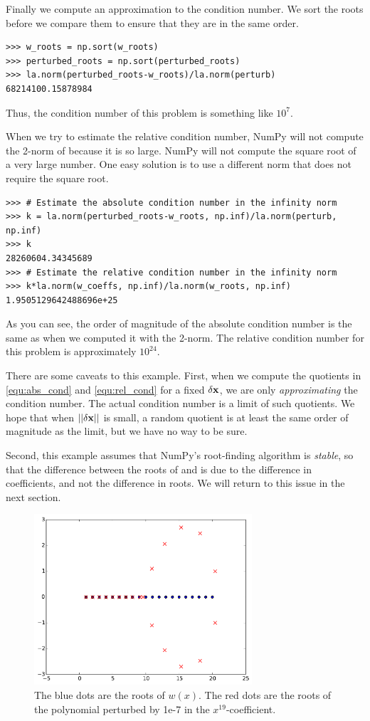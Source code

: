 Finally we compute an approximation to the condition number.
We sort the roots before we compare them to ensure that they are in the same order.
\begin{lstlisting}
>>> w_roots = np.sort(w_roots)
>>> perturbed_roots = np.sort(perturbed_roots)
>>> la.norm(perturbed_roots-w_roots)/la.norm(perturb)
68214100.15878984
\end{lstlisting}
Thus, the condition number of this problem is something like $10^7$. 

When we try to estimate the relative condition number, NumPy will not compute the 2-norm of  because it is so large.
NumPy will not compute the square root of a very large number.
One easy solution is to use a different norm that does not require the square root. 
\begin{lstlisting}
>>> # Estimate the absolute condition number in the infinity norm
>>> k = la.norm(perturbed_roots-w_roots, np.inf)/la.norm(perturb, np.inf)
>>> k
28260604.34345689
>>> # Estimate the relative condition number in the infinity norm
>>> k*la.norm(w_coeffs, np.inf)/la.norm(w_roots, np.inf)
1.9505129642488696e+25
\end{lstlisting}
As you can see, the order of magnitude of the absolute condition number is the same as when we computed it with the 2-norm.
The relative condition number for this problem is approximately $10^{24}$.


There are some caveats to this example. 
First, when we compute the quotients in \eqref{equ:abs_cond} and \eqref{equ:rel_cond} for a fixed $\delta {\bf x}$, we are only \emph{approximating} the condition number.
The actual condition number is a limit of such quotients.
We hope that when $||\delta {\bf x}||$ is small, a random quotient is at least the same order of magnitude as the limit, but we have no way to be sure.

Second, this example assumes that NumPy's root-finding algorithm is \emph{stable}, so that the difference between the roots of  and  is due to the difference in coefficients, and not the difference in roots.
We will return to this issue in the next section.


\begin{figure}
\centering
\includegraphics[height=2.5in]{wilkinsonpolynomial.pdf}
\caption{The blue dots are the roots of $w(x)$. The red dots are the roots of the polynomial perturbed by 1e-7 in the $x^{19}$-coefficient. }
\label{fig:wilkinsonpolynomial}
\end{figure}


